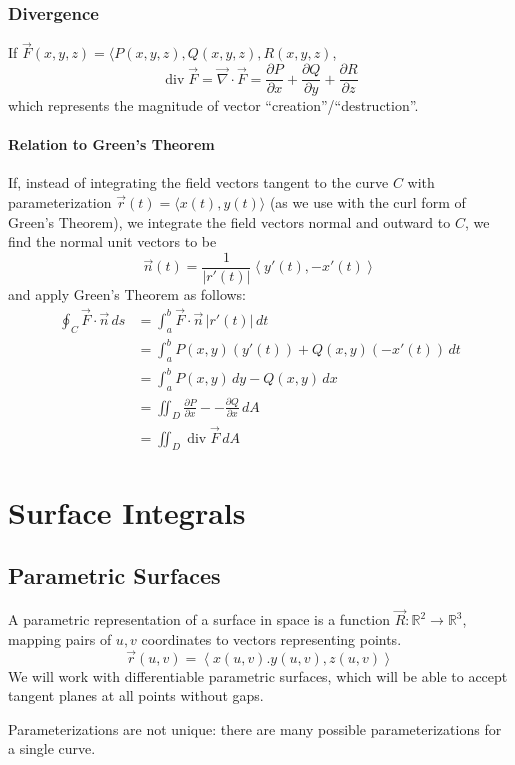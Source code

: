 \documentclass{article}
\DeclareMathOperator{\divergence}{div}
\newcommand{\vect}[1]{\ensuremath{\overrightarrow{#1}}}
\begin{document}
\subsubsection{Divergence}
If $\vect{F}(x,y,z)=\langle P(x,y,z), Q(x,y,z), R(x,y,z)$,
$$\divergence \vect{F} = \vect{\nabla}\cdot\vect{F}= \frac{\partial P}{\partial x} + \frac{\partial Q}{\partial y} + \frac{\partial R}{\partial z}$$
which represents the magnitude of vector ``creation''/``destruction''.

\paragraph{Relation to Green's Theorem}
If, instead of integrating the field vectors tangent to the curve $C$ with parameterization $\vect{r}(t) = \langle x(t), y(t)\rangle$ (as we use with the curl form of Green's Theorem), we integrate the field vectors normal and outward to $C$, we find the normal unit vectors to be
$$\vect{n}(t) = \frac{1}{|r'(t)|}\left\langle y'(t), -x'(t)\right\rangle$$ and apply Green's Theorem as follows:
\begin{align*}
    \oint_C \vect{F}\cdot\vect{n}\,ds&=\int_a^b \vect{F}\cdot\vect{n}\,|r'(t)|\,dt\\
    &=\int_a^b P(x,y)(y'(t))+Q(x,y)(-x'(t))\,dt\\
    &=\int_a^b P(x,y)\,dy-Q(x,y)\,dx\\
    &=\iint_D \frac{\partial P}{\partial x} --\frac{\partial Q}{\partial x}\,dA\\
    &=\iint_D \divergence\vect{F}\,dA
\end{align*}

\section{Surface Integrals}
\subsection{Parametric Surfaces}
A parametric representation of a surface in space is a function $\vect{R}:\mathbb{R}^2\to\mathbb{R}^3$, mapping pairs of $u,v$ coordinates to vectors representing points.
$$\vect{r}(u,v)=\left\langle x(u,v).y(u,v), z(u,v) \right\rangle$$
We will work with differentiable parametric surfaces, which will be able to accept tangent planes at all points without gaps.

Parameterizations are not unique: there are many possible parameterizations for a single curve.
\end{document}
